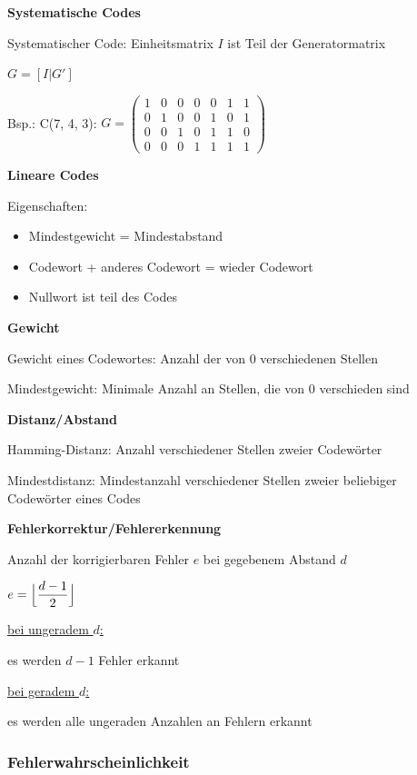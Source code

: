 \textbf{Systematische Codes}

Systematischer Code: Einheitsmatrix $I$ ist Teil der Generatormatrix

$\displaystyle{
    G = [I | G']
}$

Bsp.: C(7, 4, 3): 
$\displaystyle{
    G =
    \begin{pmatrix}
        1 & 0 & 0 & 0 & 0 & 1 & 1\\
        0 & 1 & 0 & 0 & 1 & 0 & 1\\
        0 & 0 & 1 & 0 & 1 & 1 & 0\\
        0 & 0 & 0 & 1 & 1 & 1 & 1
    \end{pmatrix}
}$

\textbf{Lineare Codes}

Eigenschaften:
\begin{itemize}
    \item Mindestgewicht = Mindestabstand
    \item Codewort + anderes Codewort = wieder Codewort
    \item Nullwort ist teil des Codes
\end{itemize}

\textbf{Gewicht}

Gewicht eines Codewortes: Anzahl der von 0 verschiedenen Stellen

Mindestgewicht: Minimale Anzahl an Stellen, die von 0 verschieden sind

\textbf{Distanz/Abstand}

Hamming-Distanz: Anzahl verschiedener Stellen zweier Codewörter

Mindestdistanz: Mindestanzahl verschiedener Stellen zweier beliebiger Codewörter eines Codes

\textbf{Fehlerkorrektur/Fehlererkennung}

Anzahl der korrigierbaren Fehler $e$ bei gegebenem Abstand $d$

$\displaystyle{
    e = \Bigl\lfloor \frac{d - 1}{2} \Bigr\rfloor
}$

\underline{bei ungeradem $d$:}

es werden $d-1$ Fehler erkannt

\underline{bei geradem $d$:}

es werden alle ungeraden Anzahlen an Fehlern erkannt

\subsubsection{Fehlerwahrscheinlichkeit}

